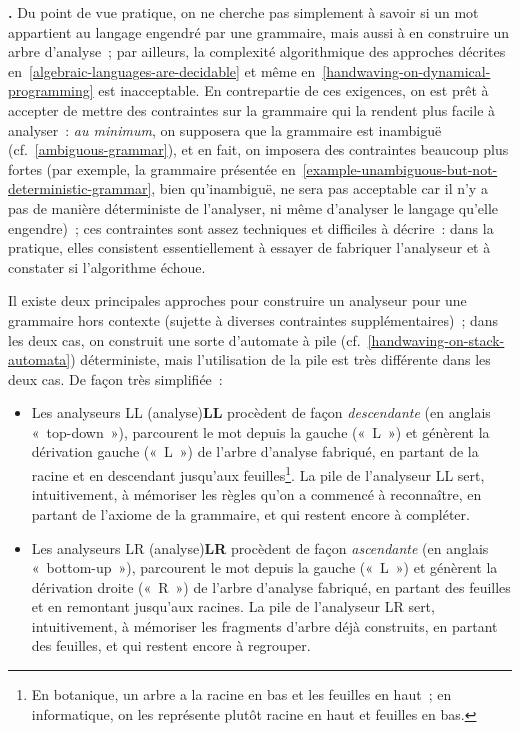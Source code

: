 \documentclass[12pt,a4paper]{article}
\theoremstyle{definition}
\newcommand\thingy{%
\refstepcounter{comcnt}\medskip\noindent\textbf{\thecomcnt.} }
\newcommand{\defin}[2][]{\def\latexsucks{#1}\ifx\latexsucks\empty\index{#2}\else\index{\latexsucks}\fi\textbf{#2}}
\begin{document}
\thingy\label{handwaving-on-ll-and-lr} Du point de vue pratique, on ne
cherche pas simplement à savoir si un mot appartient au langage
engendré par une grammaire, mais aussi à en construire un arbre
d'analyse ; par ailleurs, la complexité algorithmique des approches
décrites en \ref{algebraic-languages-are-decidable} et même
en \ref{handwaving-on-dynamical-programming} est inacceptable.  En
contrepartie de ces exigences, on est prêt à accepter de mettre des
contraintes sur la grammaire qui la rendent plus facile à analyser :
\emph{au minimum}, on supposera que la grammaire est inambiguë
(cf. \ref{ambiguous-grammar}), et en fait, on imposera des contraintes
beaucoup plus fortes (par exemple, la grammaire présentée
en \ref{example-unambiguous-but-not-deterministic-grammar}, bien
qu'inambiguë, ne sera pas acceptable car il n'y a pas de manière
déterministe de l'analyser, ni même d'analyser le langage qu'elle
engendre) ; ces contraintes sont assez techniques et difficiles à
décrire : dans la pratique, elles consistent essentiellement à essayer
de fabriquer l'analyseur et à constater si l'algorithme échoue.

\smallskip

Il existe deux principales approches pour construire un analyseur pour
une grammaire hors contexte (sujette à diverses contraintes
supplémentaires) ; dans les deux cas, on construit une sorte
d'automate à pile (cf. \ref{handwaving-on-stack-automata})
déterministe, mais l'utilisation de la pile est très différente dans
les deux cas.   De façon très simplifiée :
\begin{itemize}
\item Les analyseurs \defin[LL (analyse)]{LL} procèdent de façon
  \emph{descendante} (en anglais « top-down »), parcourent le mot
  depuis la gauche (« L ») et génèrent la dérivation gauche (« L ») de
  l'arbre d'analyse fabriqué, en partant de la racine et en descendant
  jusqu'aux feuilles\footnote{En botanique, un arbre a la racine en
    bas et les feuilles en haut ; en informatique, on les représente
    plutôt racine en haut et feuilles en bas.}.  La pile de
  l'analyseur LL sert, intuitivement, à mémoriser les règles qu'on a
  commencé à reconnaître, en partant de l'axiome de la grammaire, et
  qui restent encore à compléter.
\item Les analyseurs \defin[LR (analyse)]{LR} procèdent de façon
  \emph{ascendante} (en anglais « bottom-up »), parcourent le mot
  depuis la gauche (« L ») et génèrent la dérivation droite (« R ») de
  l'arbre d'analyse fabriqué, en partant des feuilles et en remontant
  jusqu'aux racines.  La pile de l'analyseur LR sert, intuitivement, à
  mémoriser les fragments d'arbre déjà construits, en partant des
  feuilles, et qui restent encore à regrouper.
\end{itemize}
\end{document}
